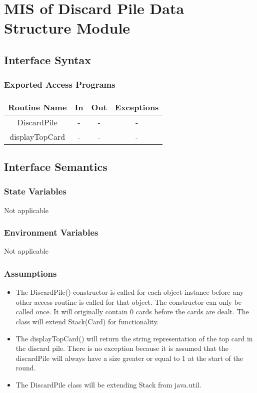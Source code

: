 \documentclass[12pt, titlepage]{article}
\begin{document}
\section{MIS of Discard Pile Data Structure Module}

\subsection{Interface Syntax}
\subsubsection{Exported Access Programs}

\begin{tabular}[pos]{| c | c | c | c |}
    \hline
    \textbf{Routine Name} & \textbf{In} & \textbf{Out} & \textbf{Exceptions}\\
    \hline
    DiscardPile & - & - & - \\
    \hline
    displayTopCard & - & - & -\\
    \hline
\end{tabular}

\subsection{Interface Semantics}
\subsubsection{State Variables}
Not applicable

\subsubsection{Environment Variables}
Not applicable

\subsubsection{Assumptions}
\begin{itemize}
    \item The DiscardPile() constructor is called for each object instance before any
      other access routine is called for that object.  The constructor can only be
      called once. It will originally contain 0 cards before the cards are dealt. The class will extend Stack(Card) for functionality.
    \item The displayTopCard() will return the string representation of the top card in the discard pile. There is no exception because it is assumed that the discardPile will always have a size greater or equal to 1 at the start of the round.
    \item The DiscardPile class will be extending Stack from java.util.
\end{itemize}
\end{document}
